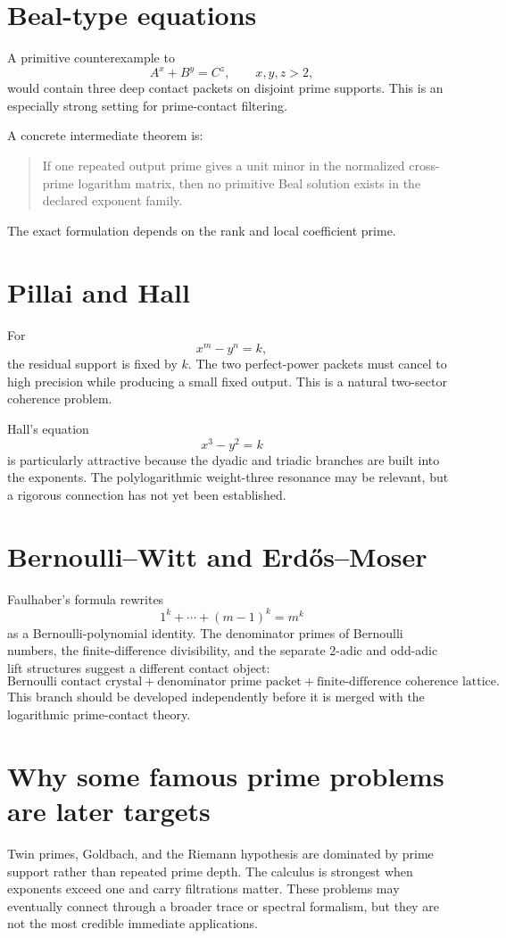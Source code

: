 \section{Beal-type equations}
A primitive counterexample to
\[
 A^x+B^y=C^z,
 \qquad x,y,z>2,
\]
would contain three deep contact packets on disjoint prime supports. This is an especially strong setting for prime-contact filtering.

A concrete intermediate theorem is:

\begin{quote}
If one repeated output prime gives a unit minor in the normalized cross-prime logarithm matrix, then no primitive Beal solution exists in the declared exponent family.
\end{quote}

The exact formulation depends on the rank and local coefficient prime.

\section{Pillai and Hall}
For
\[
 x^m-y^n=k,
\]
the residual support is fixed by $k$. The two perfect-power packets must cancel to high precision while producing a small fixed output. This is a natural two-sector coherence problem.

Hall's equation
\[
 x^3-y^2=k
\]
is particularly attractive because the dyadic and triadic branches are built into the exponents. The polylogarithmic weight-three resonance may be relevant, but a rigorous connection has not yet been established.

\section{Bernoulli--Witt and Erd\H{o}s--Moser}
Faulhaber's formula rewrites
\[
 1^k+\cdots+(m-1)^k=m^k
\]
as a Bernoulli-polynomial identity. The denominator primes of Bernoulli numbers, the finite-difference divisibility, and the separate $2$-adic and odd-adic lift structures suggest a different contact object:
\[
 \boxed{
 \text{Bernoulli contact crystal}
 +
 \text{denominator prime packet}
 +
 \text{finite-difference coherence lattice}.
 }
\]
This branch should be developed independently before it is merged with the logarithmic prime-contact theory.

\section{Why some famous prime problems are later targets}
Twin primes, Goldbach, and the Riemann hypothesis are dominated by prime support rather than repeated prime depth. The calculus is strongest when exponents exceed one and carry filtrations matter. These problems may eventually connect through a broader trace or spectral formalism, but they are not the most credible immediate applications.

